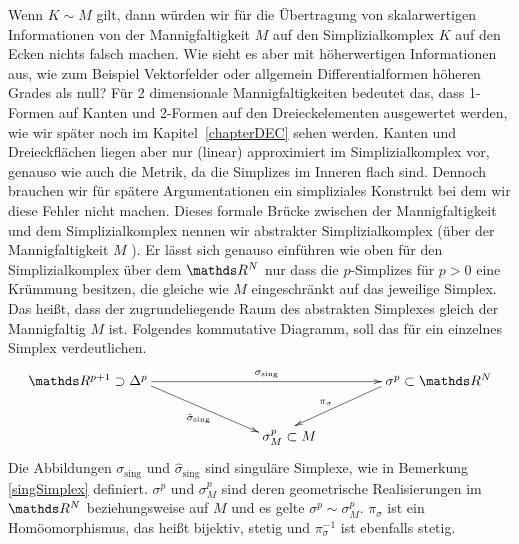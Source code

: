     \begin{bemerkung}
      Wenn \( K \sim M \) gilt, dann würden wir für die Übertragung von skalarwertigen Informationen von der Mannigfaltigkeit
      \( M \) auf den Simplizialkomplex \( K \) auf den Ecken nichts falsch machen.
      Wie sieht es aber mit höherwertigen Informationen aus, wie zum Beispiel Vektorfelder oder 
      allgemein Differentialformen höheren Grades als null?
      Für 2 dimensionale Mannigfaltigkeiten bedeutet das, dass 1-Formen auf Kanten und 2-Formen auf den Dreieckelementen ausgewertet
      werden, wie wir später noch im Kapitel~\ref{chapterDEC} sehen werden.
      Kanten und Dreieckflächen liegen aber nur (linear) approximiert im Simplizialkomplex vor, genauso wie auch die Metrik,
      da die Simplizes im Inneren flach sind.
      Dennoch brauchen wir für spätere Argumentationen ein simpliziales Konstrukt bei dem wir diese Fehler nicht machen.
      Dieses formale Brücke zwischen der Mannigfaltigkeit und dem Simplizialkomplex nennen wir abstrakter Simplizialkomplex (über der Mannigfaltigkeit \( M \) ). 
      Er lässt sich genauso einführen wie oben für den Simplizialkomplex über dem \( \R^{N} \) 
      nur dass die \(p\)-Simplizes für \( p > 0 \) eine Krümmung besitzen, die gleiche wie \( M \) eingeschränkt auf das jeweilige Simplex.
      Das heißt, dass der zugrundeliegende Raum des abstrakten Simplexes gleich der Mannigfaltig \( M \) ist.
      Folgendes kommutative Diagramm, soll das für ein einzelnes Simplex verdeutlichen.
      \begin{align}
        \label{diagSingulaerAbstrakt}
        \begin{xy}
          \xymatrix{
            **[l] \R^{p+1} \supset \Delta^{p} \ar[rr]^{\sigma_{\text{sing}}} \ar[rd]_{\hat{\sigma}_{\text{sing}}} 
            & & **[r] \sigma^{p} \subset \R^{N} \ar[ld]_{\pi_{\sigma}} \\
                                       & **[r] \sigma^{p}_{M}\subset M&
          }
        \end{xy}
      \end{align}
      Die Abbildungen \( \sigma_{\text{sing}} \) und \( \hat{\sigma}_{\text{sing}} \) sind singuläre Simplexe, wie in
      Bemerkung \ref{singSimplex} definiert. \( \sigma^{p} \) und \( \sigma^{p}_{M} \) sind deren geometrische Realisierungen im \( \R^{N} \) beziehungsweise auf \( M \)
      und es gelte \( \sigma^{p} \sim \sigma^{p}_{M} \).
      \( \pi_{\sigma} \) ist ein Homöomorphismus, das heißt bijektiv, stetig und \( \pi_{\sigma}^{-1} \) ist ebenfalls stetig.

\end{bemerkung}
